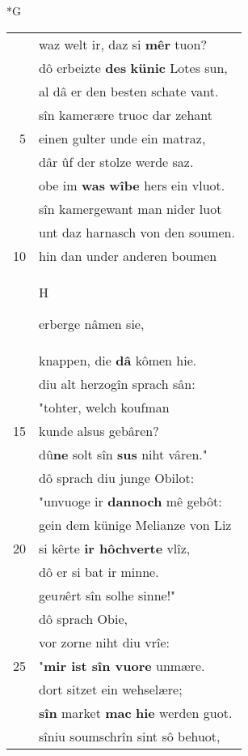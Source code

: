 \documentclass[8pt,a4paper,notitlepage]{article}
\begin{document}
\begin{table}[ht]
\begin{minipage}[t]{0.5\linewidth}
\small
\begin{center}*G
\end{center}
\begin{tabular}{rl}
 & waz welt ir, daz si \textbf{mêr} tuon?\\ 
 & dô erbeizte \textbf{des} \textbf{künic} Lotes sun,\\ 
 & al dâ er den besten schate vant.\\ 
 & sîn kamerære truoc dar zehant\\ 
5 & einen gulter unde ein matraz,\\ 
 & dâr ûf der stolze werde saz.\\ 
 & obe im \textbf{was} \textbf{wîbe} hers ein vluot.\\ 
 & sîn kamergewant man nider luot\\ 
 & unt daz harnasch von den soumen.\\ 
10 & hin dan under anderen boumen\\ 
 & \begin{large}H\end{large}erberge nâmen sie,\\ 
 & knappen, die \textbf{dâ} kômen hie.\\ 
 & diu alt herzogîn sprach sân:\\ 
 & "tohter, welch koufman\\ 
15 & kunde alsus gebâren?\\ 
 & dû\textbf{ne} solt sîn \textbf{sus} niht vâren."\\ 
 & dô sprach diu junge Obilot:\\ 
 & "unvuoge ir \textbf{dannoch} mê gebôt:\\ 
 & gein dem künige Melianze von Liz\\ 
20 & si kêrte \textbf{ir hôchverte} vlîz,\\ 
 & dô er si bat ir minne.\\ 
 & geu\textit{n}êrt sîn solhe sinne!"\\ 
 & dô sprach Obie,\\ 
 & vor zorne niht diu vrîe:\\ 
25 & "\textbf{mir ist sîn vuore} unmære.\\ 
 & dort sitzet ein wehselære;\\ 
 & \textbf{sîn} market \textbf{mac} \textbf{hie} werden guot.\\ 
 & sîniu soumschrîn sint sô behuot,\\ 

\end{tabular}
\end{minipage}
\end{table}
\end{document}
